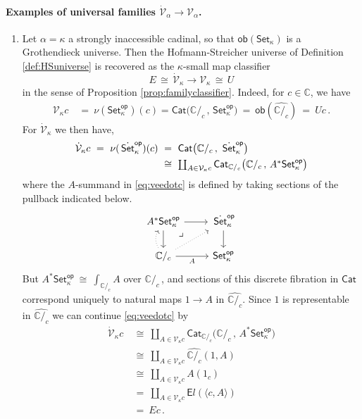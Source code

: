 \documentclass[11pt]{amsart}
\newcommand{\bbC}{\ensuremath{\mathbb{C}}}
\newcommand{\Set}{\ensuremath{\mathsf{Set}}}
\newcommand{\Cat}{\ensuremath{\mathsf{Cat}}}
\renewcommand{\to}{\ensuremath{\rightarrow}}
\newcommand{\too}{\ensuremath{\longrightarrow}}
\newcommand{\V}{\ensuremath{\mathcal{V}}}
\newcommand{\VV}{\ensuremath{\dot{\mathcal{V}}}}
\newcommand{\SSet}{\ensuremath{\,\dot{\Set}}}
\theoremstyle{remark}
\theoremstyle{definition}
\newcommand{\pbmark}{\ar[dr, phantom, "\lrcorner" very near start, shift right=.5ex]}	%
\begin{document}
\paragraph{Examples of universal families $\VV_\alpha \too \V_\alpha$.}\label{examples:universalfamilies}

\begin{enumerate}
%
\item Let $\alpha = \kappa$ a strongly inaccessible cadinal, so that $\mathsf{ob}({\Set_\kappa})$ is a Grothendieck universe.  Then the Hofmann-Streicher universe of Definition \ref{def:HSuniverse} is recovered as the $\kappa$-small map classifier
\begin{equation*}
E\, \cong\, \VV_\kappa \too \V_\kappa\, \cong\, U
\end{equation*}
 in the sense of Proposition \ref{prop:familyclassifier}.  Indeed, for $c\in\bbC$, we have 
 \begin{align}
  \V_{\kappa}{c}\ &=\ \nu(\Set^{\mathsf{op}}_\kappa)(c) = \Cat\big( {\bbC/_c}\,,\, \Set^{\mathsf{op}}_\kappa \big)\  =\ \mathsf{ob}(\widehat{\bbC/_c})\ =\ U{c} \,.
   \end{align} 
For $\VV_{\kappa}$ we then have,
   \begin{align}\label{eq:veedotc}
   \VV_{\kappa}{c}\ =\ \nu(\SSet^{\mathsf{op}}_\kappa)(c)\ &=\ \Cat\big( {\bbC/_c}\,,\, \SSet^{\mathsf{op}}_\kappa \big) \notag \\ 
   &\cong\ {\textstyle \coprod_{A\in\V_{\kappa}{c}}\Cat_{{\bbC/_c}}\big( {\bbC/_c}\,,\, A^*\Set^{\mathsf{op}}_\kappa \big)}
   \end{align}
   where the $A$-summand in \eqref{eq:veedotc} is defined by taking sections of the  pullback indicated below.
   \begin{equation}\label{eq:pbforindexing}\textstyle
\begin{tikzcd}
	A^*\Set^{\mathsf{op}}_\kappa \ar[d] \ar[r] \pbmark & \SSet^{\mathsf{op}}_\kappa \ar[d]\\  
	\bbC/_c \ar[r,swap,"A"] \ar[u, bend left, dotted] \ar[ur, dotted] &  \Set^{\mathsf{op}}_\kappa
 \end{tikzcd}
 \end{equation}
 But $A^*\Set^{\mathsf{op}}_\kappa\ \cong\ {\textstyle \int_{\bbC/_c}\!A}$ over $\bbC/_c\,$, and sections of this discrete fibration in $\Cat$ correspond uniquely to natural maps $1\to A$ in $\widehat{{\bbC/_c}}$.  Since $1$  is representable in $\widehat{{\bbC/_c}}$ we can continue \eqref{eq:veedotc} by
  \begin{align*}
   \VV_{\kappa}{c}\ &\cong\ {\textstyle \coprod_{A\in \V_{\kappa}{c}}\Cat_{{\bbC/_c}}\big( {\bbC/_c}\,,\, A^*\Set^{\mathsf{op}}_\kappa \big)}\\
   	&\cong\ {\textstyle \coprod_{A\in \V_{\kappa}{c}} \widehat{{\bbC/_c}}(1, A)}\\
	&\cong\ {\textstyle \coprod_{A\in \V_{\kappa}{c}} A(1_c) } \\
	& =\ {\textstyle \coprod_{A\in \V_{\kappa}{c}} {\mathsf{E}l}(\langle c, A\rangle)}\\
	& =\  E c\,.
   \end{align*}
 

\end{enumerate}
\end{document}
